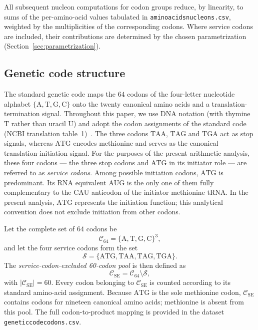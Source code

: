 \documentclass[11pt,a4paper]{article}
\renewcommand{\_}{\origunderscore\allowbreak}
\begin{document}
All subsequent nucleon computations for codon groups reduce, by
linearity, to sums of the per-amino-acid values tabulated in
\texttt{amino\_acids\_nucleons.csv}, weighted by the multiplicities of
the corresponding codons. Where service codons are included, their
contributions are determined by the chosen parametrization
(Section~\ref{sec:parametrization}).

\subsection{Genetic code structure}
\label{sec:genetic-code}

The standard genetic code maps the $64$ codons of the four-letter
nucleotide alphabet $\{\mathrm{A}, \mathrm{T}, \mathrm{G}, \mathrm{C}\}$
onto the twenty canonical amino acids and a translation-termination
signal. Throughout this paper, we use DNA notation (with thymine
$\mathrm{T}$ rather than uracil $\mathrm{U}$) and adopt the codon
assignments of the standard code (NCBI translation
table~1)~\cite{ncbi2024geneticcodes}. The three codons $\mathrm{TAA}$,
$\mathrm{TAG}$ and $\mathrm{TGA}$ act as stop signals, whereas
$\mathrm{ATG}$ encodes methionine and serves as the canonical
translation-initiation signal. For the purposes of the present
arithmetic analysis, these four codons --- the three stop codons and
$\mathrm{ATG}$ in its initiator role --- are referred to as
\emph{service codons}. Among possible initiation codons, $\mathrm{ATG}$
is predominant. Its RNA equivalent $\mathrm{AUG}$ is the only one of
them fully complementary to the $\mathrm{CAU}$ anticodon of the
initiator methionine tRNA. In the present analysis, $\mathrm{ATG}$
represents the initiation function; this analytical convention does not
exclude initiation from other codons.

Let the complete set of $64$ codons be
\[
\mathcal{C}_{64}
=
\{\mathrm{A},\mathrm{T},\mathrm{G},\mathrm{C}\}^{3},
\]
and let the four service codons form the set
\[
\mathcal{S}
=
\{\mathrm{ATG},\mathrm{TAA},\mathrm{TAG},\mathrm{TGA}\}.
\]
The \emph{service-codon-excluded 60-codon pool} is then defined as
\[
\mathcal{C}_{\mathrm{SE}}
=
\mathcal{C}_{64}\setminus\mathcal{S},
\]
with $|\mathcal{C}_{\mathrm{SE}}|=60$. Every codon belonging to
$\mathcal{C}_{\mathrm{SE}}$ is counted according to its standard
amino-acid assignment. Because $\mathrm{ATG}$ is the sole methionine codon,
$\mathcal{C}_{\mathrm{SE}}$ contains codons for nineteen canonical
amino acids; methionine is absent from this pool. The full codon-to-product mapping is provided
in the dataset \texttt{genetic\_code\_codons.csv}.
\end{document}
